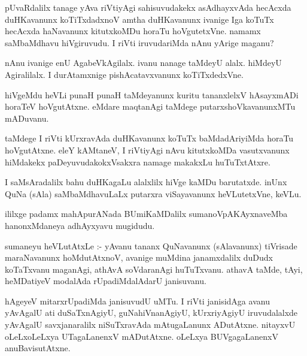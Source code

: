 \documentclass{article}
\begin{document}
\begin{mn}
pUvaRdalilx tanage yAva riVtiyAgi sahisuvudakekx asAdhayxvAda hecAcxda duHKavanunx 
koTiTxdadxnoV amtha duHKavanunx ivanige Iga koTuTx hecAcxda haNavanunx kitutxkoMDu 
horaTu hoVgutetxVne. namamx saMbaMdhavu hiVgiruvudu. I riVti iruvudariMda nAnu yArige maganu?
\end{mn}

\begin{mn}
nAnu ivanige enU AgabeVkAgilalx. ivanu nanage taMdeyU alalx. hiMdeyU Agiralilalx. 
 I durAtamxnige pishAcatavxvanunx koTiTxdedxVne.
\end{mn}

\begin{mn}
hiVgeMdu heVLi punaH punaH taMdeyanunx kuritu tananxlelxV hAsayxmADi horaTeV 
hoVgutAtxne.  eMdare maqtanAgi  taMdege putarxshoVkavanunxMTu mADuvanu.
\end{mn}

\begin{mn}
taMdege I riVti kUrxravAda duHKavanunx koTuTx baMdadAriyiMda horaTu hoVgutAtxne. 
 eleY kAMtaneV, I riVtiyAgi nAvu kitutxkoMDa vasutxvanunx hiMdakekx 
 paDeyuvudakokxVsakxra namage makakxLu huTuTxtAtxre. 
\end{mn}

\begin{mn}
I saMsAradalilx bahu duHKagaLu alalxlilx hiVge kaMDu barutatxde.  inUnx 
QuNa (sAla) saMbaMdhavuLaLx putarxra viSayavanunx heVLutetxVne, keVLu. 
\end{mn}

\begin{mn}ililxge padamx mahApurANada BUmiKaMDalilx sumanoVpAKAyxnaveMba
hanonxMdaneya adhAyxyavu mugidudu.
\end{mn}

\begin{mn}
sumaneyu heVLutAtxLe :- yAvanu tananx QuNavanunx (sAlavanunx) tiVrisade 
maraNavanunx hoMdutAtxnoV,  avanige muMdina janamxdalilx duDudx koTaTxvanu
 maganAgi, athAvA soVdaranAgi huTuTxvanu.  athavA  taMde, tAyi, heMDatiyeV 
 modalAda rUpadiMdalAdarU janisuvanu.
\end{mn}

\begin{mn}
hAgeyeV mitarxrUpadiMda janisuvudU uMTu.  I riVti janisidAga avanu yAvAgalU
 ati duSaTxnAgiyU, guNahiVnanAgiyU, kUrxriyAgiyU iruvudalalxde yAvAgalU 
 savxjanaralilx niSuTxravAda mAtugaLanunx ADutAtxne. nitayxvU oLeLxoLeLxya 
 UTagaLanenxV mADutAtxne. oLeLxya BUVgagaLanenxV  anuBavisutAtxne.
\end{mn}
\end{document}
